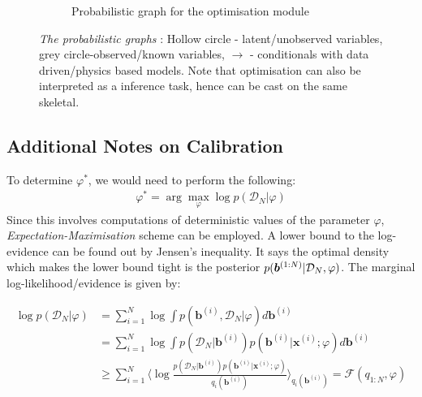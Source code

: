 \documentclass[a4paper,11pt]{article}
\begin{document}
\begin{figure}[!htpb]
\begin{subfigure}{0.4\textwidth}
    \caption{Probabilistic graph for the optimisation module}
    \label{fig:opt_graph}
\end{subfigure}
\caption{\emph{The probabilistic graphs} : Hollow circle - latent/unobserved variables, grey circle-observed/known variables, $\longrightarrow$ - conditionals with data driven/physics based models. Note that optimisation can also be interpreted as a inference task, hence can be cast on the same skeletal. }
\label{fig:prob_graphs}
\end{figure}



\clearpage
\subsection*{Additional Notes on Calibration}
To determine $\varphi^*$, we would need to perform the following:
\begin{align*}
    \varphi^* = \arg \max_{\varphi} \log p(\mathcal{D}_N|\varphi)
\end{align*}
Since this involves computations of deterministic values of the parameter $\varphi$, \textit{Expectation-Maximisation} scheme can be employed. A lower bound to the log-evidence can be found out by Jensen's inequality. It says the optimal density which makes the lower bound tight is the posterior $p(\boldsymbol{b}^{(1:N)} | \mathcal{D}_N, \varphi)$. The marginal log-likelihood/evidence is given by:

\begin{align}
    \log p(\mathcal{D}_N|\varphi) &= \sum_{i=1}^N\log \int p(\bm {b}^{(i)},\mathcal{D}_N| \varphi)d\bm {b}^{(i)}\\
    &= \sum_{i=1}^N \log \int p(\mathcal{D}_N | \bm {b}^{(i)}) p(\bm b^{(i)}|\bm x^{(i)};\varphi) d\bm b^{(i)}\\
    &\geq \sum_{i=1}^N \langle \log \frac{ p(\mathcal{D}_N | \bm b^{(i)}) p(\bm b^{(i)}|\bm x^{(i)};\varphi)}{q_i(\bm b^{(i)})} \rangle_{q_i(\bm b^{(i)})}=\mathcal{F}(q_{1:N},\varphi)
\end{align}
\end{document}
